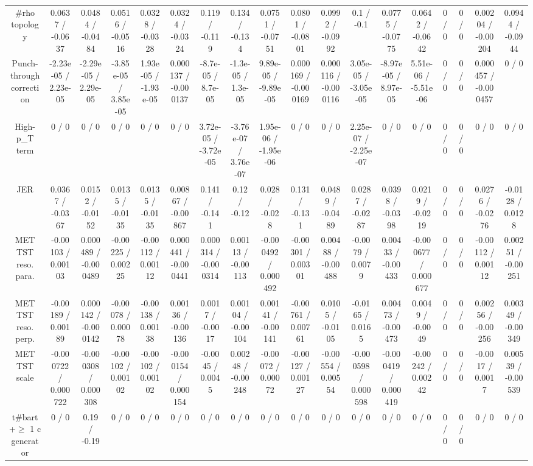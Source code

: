 \documentclass[10pt]{article}
\begin{document}
\begin{table}[htbp]
\begin{center}
\begin{tabular}{|c|c|c|c|c|c|c|c|c|c|c|c|c|c|c|c|c|c|}
  #rho topology & 0.0637 / -0.0637 & 0.0484 / -0.0484 & 0.0516 / -0.0516 & 0.0328 / -0.0328 & 0.0324 / -0.0324 & 0.119 / -0.119 & 0.134 / -0.134 & 0.0751 / -0.0751 & 0.0801 / -0.0801 & 0.0992 / -0.0992 & 0.1 / -0.1 & 0.0775 / -0.0775 & 0.0642 / -0.0642 & 0 / 0 & 0 / 0 & 0.00204 / -0.00204 & 0.0944 / -0.0944 \\ 
  Punch-through correction & -2.23e-05 / 2.23e-05 & -2.29e-05 / 2.29e-05 & -3.85e-05 / 3.85e-05 & 1.93e-05 / -1.93e-05 & 0.000137 / -0.000137 & -8.7e-05 / 8.7e-05 & -1.3e-05 / 1.3e-05 & 9.89e-05 / -9.89e-05 & 0.000169 / -0.000169 & 0.000116 / -0.000116 & 3.05e-05 / -3.05e-05 & -8.97e-05 / 8.97e-05 & 5.51e-06 / -5.51e-06 & 0 / 0 & 0 / 0 & 0.000457 / -0.000457 & 0 / 0 \\ 
  High-p_{T} term & 0 / 0 & 0 / 0 & 0 / 0 & 0 / 0 & 0 / 0 & 3.72e-05 / -3.72e-05 & -3.76e-07 / 3.76e-07 & 1.95e-06 / -1.95e-06 & 0 / 0 & 0 / 0 & 2.25e-07 / -2.25e-07 & 0 / 0 & 0 / 0 & 0 / 0 & 0 / 0 & 0 / 0 & 0 / 0 \\ 
  JER & 0.0367 / -0.0367 & 0.0152 / -0.0152 & 0.0135 / -0.0135 & 0.0135 / -0.0135 & 0.00867 / -0.00867 & 0.141 / -0.141 & 0.12 / -0.12 & 0.028 / -0.028 & 0.131 / -0.131 & 0.0489 / -0.0489 & 0.0287 / -0.0287 & 0.0398 / -0.0398 & 0.0219 / -0.0219 & 0 / 0 & 0 / 0 & 0.0276 / -0.0276 & -0.0128 / 0.0128 \\ 
  MET TST reso. para. & -0.00103 / 0.00103 & 0.000489 / -0.000489 & -0.00225 / 0.00225 & -0.00112 / 0.00112 & 0.000441 / -0.000441 & 0.000314 / -0.000314 & 0.00113 / -0.00113 & -0.000492 / 0.000492 & -0.00301 / 0.00301 & 0.00488 / -0.00488 & -0.0079 / 0.0079 & 0.00433 / -0.00433 & -0.000677 / 0.000677 & 0 / 0 & 0 / 0 & -0.00112 / 0.00112 & 0.00251 / -0.00251 \\ 
  MET TST reso. perp. & -0.00189 / 0.00189 & 0.000142 / -0.000142 & -0.00078 / 0.00078 & -0.00138 / 0.00138 & 0.00136 / -0.00136 & 0.0017 / -0.0017 & 0.00104 / -0.00104 & 0.00141 / -0.00141 & -0.00761 / 0.00761 & 0.0105 / -0.0105 & -0.0165 / 0.0165 & 0.00473 / -0.00473 & 0.0049 / -0.0049 & 0 / 0 & 0 / 0 & 0.00256 / -0.00256 & 0.00349 / -0.00349 \\ 
  MET TST scale & -0.000722 / 0.000722 & -0.000308 / 0.000308 & -0.00102 / 0.00102 & -0.00102 / 0.00102 & -0.000154 / 0.000154 & -0.0045 / 0.0045 & 0.00248 / -0.00248 & -0.00072 / 0.00072 & -0.00127 / 0.00127 & -0.00554 / 0.00554 & -0.000598 / 0.000598 & -0.000419 / 0.000419 & -0.00242 / 0.00242 & 0 / 0 & 0 / 0 & -0.0017 / 0.0017 & 0.00539 / -0.00539 \\ 
  t#bar{t}+$\geq$ 1 c generator & 0 / 0 & 0.19 / -0.19 & 0 / 0 & 0 / 0 & 0 / 0 & 0 / 0 & 0 / 0 & 0 / 0 & 0 / 0 & 0 / 0 & 0 / 0 & 0 / 0 & 0 / 0 & 0 / 0 & 0 / 0 & 0 / 0 & 0 / 0 \\ 

\end{tabular}
\end{center}
\end{table}
\end{document}
